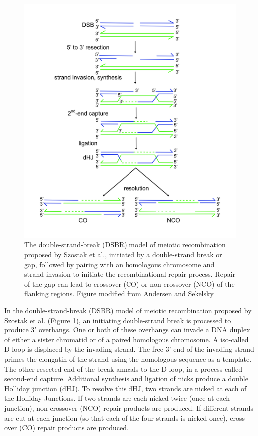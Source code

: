 \begin{figure}

{\centering \includegraphics[width=0.7\linewidth]{./figures/linkage/DSBR_model} 

}

\caption{The double-strand-break (DSBR) model of meiotic recombination proposed by \href{https://www.ncbi.nlm.nih.gov/pubmed/6380756}{Szostak et al.}, initiated by a double-strand break or gap, followed by pairing with an homologous chromosome and strand invasion to initiate the recombinational repair process. Repair of the gap can lead to crossover (CO) or non-crossover (NCO) of the flanking regions. Figure modified from \href{https://www.ncbi.nlm.nih.gov/pubmed/20967781}{Andersen and Sekelsky}}\label{fig:recombination}
\end{figure}

In the double-strand-break (DSBR) model of meiotic recombination proposed by \href{https://www.ncbi.nlm.nih.gov/pubmed/6380756}{Szostak et al.} (Figure \ref{fig:recombination}), an initiating double-strand break is processed to produce 3' overhangs. One or both of these overhangs can invade a DNA duplex of either a sister chromatid or of a paired homologous chromosome. A iso-called D-loop is displaced by the invading strand. The free 3' end of the invading strand primes the elongatin of the strand using the homologous sequence as a template. The other resected end of the break anneals to the D-loop, in a process called second-end capture. Additional synthesis and ligation of nicks produce a double Holliday junction (dHJ). To resolve this dHJ, two strands are nicked at each of the Holliday Junctions. If two strands are each nicked twice (once at each junction), non-crossover (NCO) repair products are produced. If different strands are cut at each junction (so that each of the four strands is nicked once), cross-over (CO) repair products are produced.

